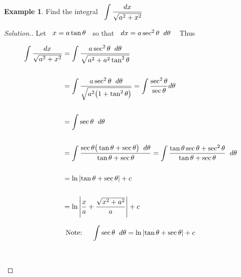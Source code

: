 \documentclass[11pt,a4paper]{article}
\theoremstyle{definition}
\newtheorem{exa}[thm]{Example}
\newenvironment{solution}
  {\renewcommand{\qedsymbol}{}\begin{proof}[\textit{Solution}.]}
  {\end{proof}}
\begin{document}
\begin{exa}


Find the integral $\hspace{0.2cm} \displaystyle{\int \dfrac{dx}{\sqrt{a^2 + x^2}}}$
\end{exa}


\begin{solution}


Let $\hspace{0.2cm}  x = a\tan \theta \hspace{0.2cm}$ so that $\hspace{0.2cm} dx = a\sec^2\theta \hspace{0.2cm}d\theta\hspace{0.3cm}$ Thus 


\begin{figure}[H]
\centering
{}
\end{figure}

\begin{align*}
\int \dfrac{dx}{\sqrt{a^2 + x^2}} & = \int \dfrac{a\sec^2\theta\hspace{0.2cm}d\theta}{\sqrt{a^2 + a^2\tan^2\theta}}\\\\
& = \int \dfrac{a\sec^2\theta \hspace{0.2cm} d\theta}{\sqrt{a^2\big(1 + \tan^2\theta\big)}} = \int \dfrac{\sec^2\theta}{\sec \theta}d\theta\\\\
& = \int \sec\theta \hspace{0.2cm}d\theta\\\\
& = \int \dfrac{\sec \theta \big(\tan \theta + \sec \theta\big)\hspace{0.2cm}d\theta}{\tan \theta + \sec\theta} = \int \dfrac{\tan \theta \sec \theta + \sec^2\theta}{\tan \theta + \sec \theta}\hspace{0.2cm}d\theta\\\\
& = \ln \left|\tan \theta + \sec \theta\right| + c\\\\
& = \ln \left|\dfrac{x}{a} + \dfrac{\sqrt{x^2 + a^2}}{a}\right| + c\\
\end{align*}

$$\text{Note:}\hspace{0.5cm} \int \sec \theta \hspace{0.2cm}d\theta = \ln\left|\tan \theta + \sec \theta\right| + c$$\\\\
\end{solution}
\end{document}
